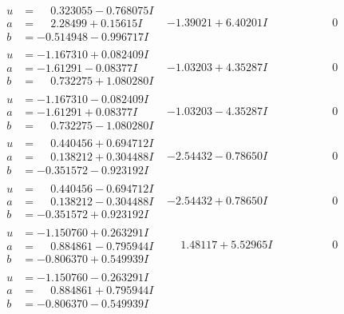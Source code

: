 \documentclass[1p]{elsarticle_modified}
\theoremstyle{definition}
\begin{document}
$$\begin{array}{c|c|c}
 \hline 
\begin{aligned}
u &= \phantom{-}0.323055 - 0.768075 I \\
a &= \phantom{-}2.28499 + 0.15615 I \\
b &= -0.514948 - 0.996717 I\end{aligned}
 & -1.39021 + 6.40201 I & \phantom{-0.000000 } 0 \\ \hline\begin{aligned}
u &= -1.167310 + 0.082409 I \\
a &= -1.61291 - 0.08377 I \\
b &= \phantom{-}0.732275 + 1.080280 I\end{aligned}
 & -1.03203 + 4.35287 I & \phantom{-0.000000 } 0 \\ \hline\begin{aligned}
u &= -1.167310 - 0.082409 I \\
a &= -1.61291 + 0.08377 I \\
b &= \phantom{-}0.732275 - 1.080280 I\end{aligned}
 & -1.03203 - 4.35287 I & \phantom{-0.000000 } 0 \\ \hline\begin{aligned}
u &= \phantom{-}0.440456 + 0.694712 I \\
a &= \phantom{-}0.138212 + 0.304488 I \\
b &= -0.351572 - 0.923192 I\end{aligned}
 & -2.54432 - 0.78650 I & \phantom{-0.000000 } 0 \\ \hline\begin{aligned}
u &= \phantom{-}0.440456 - 0.694712 I \\
a &= \phantom{-}0.138212 - 0.304488 I \\
b &= -0.351572 + 0.923192 I\end{aligned}
 & -2.54432 + 0.78650 I & \phantom{-0.000000 } 0 \\ \hline\begin{aligned}
u &= -1.150760 + 0.263291 I \\
a &= \phantom{-}0.884861 - 0.795944 I \\
b &= -0.806370 + 0.549939 I\end{aligned}
 & \phantom{-}1.48117 + 5.52965 I & \phantom{-0.000000 } 0 \\ \hline\begin{aligned}
u &= -1.150760 - 0.263291 I \\
a &= \phantom{-}0.884861 + 0.795944 I \\
b &= -0.806370 - 0.549939 I\end{aligned}

\end{array}$$
\end{document}
